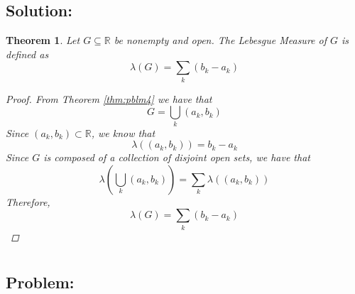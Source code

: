\documentclass[]{article}
\newcommand{\R}{\mathbb{R}}
\newtheorem{theorem}{Theorem}
\begin{document}
\subsection*{Solution:}
\begin{theorem}
    Let $G \subseteq \R$ be nonempty and open. 
    The Lebesgue Measure of $G$ is defined as \[
        \lambda(G) = \sum_{k} (b_k - a_k)
    \]
    \begin{proof}
        From Theorem \ref{thm:pblm4} we have that \[
            G = \bigcup_{k} (a_k, b_k)
        \] Since $(a_k, b_k) \subset \R$, we know that \[
            \lambda((a_k, b_k)) = b_k - a_k
        \] Since $G$ is composed of a collection of disjoint open sets, we have that \[
            \lambda(\bigcup_{k} (a_k, b_k)) = \sum_{k} \lambda((a_k, b_k))
        \] Therefore, \[
            \lambda(G) = \sum_{k} (b_k - a_k)
        \]
    \end{proof}
\end{theorem}

\newpage
\section{}
\subsection*{Problem:}
\end{document}
